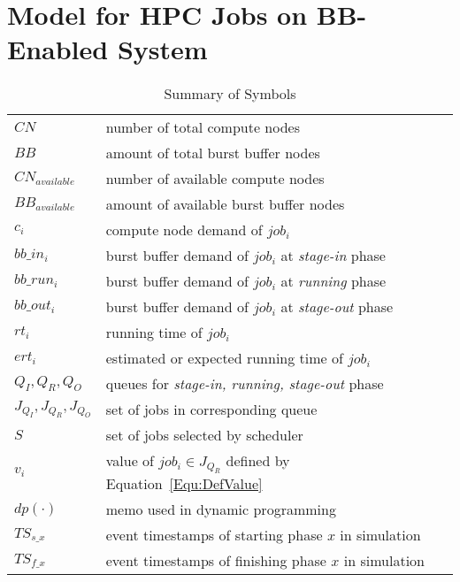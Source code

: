 \section{Model for HPC Jobs on BB-Enabled System}
\label{Sec:Model}

\begin{table}[!t] 
        \renewcommand{\arraystretch}{1.3}
        \caption{Summary of Symbols}
        \label{Tab:Symbols}
        \centering
        \begin{tabular}{l|l}
                \hline
                $CN$ & number of total compute nodes \\
                $BB$ & amount of total burst buffer nodes \\
                $CN_{available}$ & number of available compute nodes \\
                $BB_{available}$ & amount of available burst buffer nodes \\
                $c_i$ & compute node demand of $job_i$ \\
                $bb\_in_i$ & burst buffer demand of $job_i$ at \textit{stage-in} phase \\
                $bb\_run_i$ & burst buffer demand of $job_i$ at \textit{running} phase \\
                $bb\_out_i$ & burst buffer demand of $job_i$ at \textit{stage-out} phase \\
                $rt_i$ & running time of $job_i$ \\
                $ert_i$ & estimated or expected running time of $job_i$ \\
                $Q_I, Q_R, Q_O$ & queues for \textit{stage-in, running, stage-out} phase \\
                $J_{Q_I}, J_{Q_R}, J_{Q_O}$ & set of jobs in corresponding queue \\
                $S$ & set of jobs selected by scheduler \\
                $v_i$ & value of $job_i \in J_{Q_R}$ defined by Equation~\ref{Equ:DefValue}\\
                $dp(\cdot)$ & memo used in dynamic programming \\
                $TS_{s\_x}$ & event timestamps of starting phase $x$ in simulation \\
                $TS_{f\_x}$ & event timestamps of finishing phase $x$ in simulation \\
                \hline
        \end{tabular}
\end{table}

